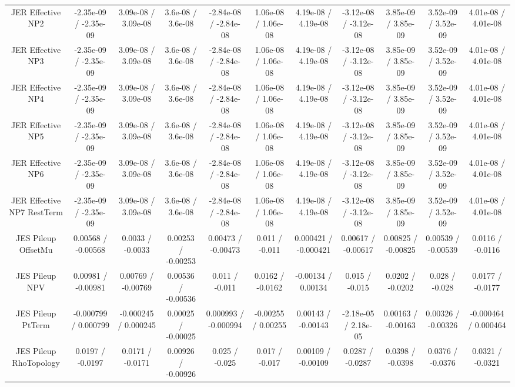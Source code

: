 \begin{table}[htbp]
\begin{center}
\begin{tabular}{|c|c|c|c|c|c|c|c|c|c|c|}
  JER Effective NP2 & -2.35e-09 / -2.35e-09 & 3.09e-08 / 3.09e-08 & 3.6e-08 / 3.6e-08 & -2.84e-08 / -2.84e-08 & 1.06e-08 / 1.06e-08 & 4.19e-08 / 4.19e-08 & -3.12e-08 / -3.12e-08 & 3.85e-09 / 3.85e-09 & 3.52e-09 / 3.52e-09 & 4.01e-08 / 4.01e-08 \\ 
  JER Effective NP3 & -2.35e-09 / -2.35e-09 & 3.09e-08 / 3.09e-08 & 3.6e-08 / 3.6e-08 & -2.84e-08 / -2.84e-08 & 1.06e-08 / 1.06e-08 & 4.19e-08 / 4.19e-08 & -3.12e-08 / -3.12e-08 & 3.85e-09 / 3.85e-09 & 3.52e-09 / 3.52e-09 & 4.01e-08 / 4.01e-08 \\ 
  JER Effective NP4 & -2.35e-09 / -2.35e-09 & 3.09e-08 / 3.09e-08 & 3.6e-08 / 3.6e-08 & -2.84e-08 / -2.84e-08 & 1.06e-08 / 1.06e-08 & 4.19e-08 / 4.19e-08 & -3.12e-08 / -3.12e-08 & 3.85e-09 / 3.85e-09 & 3.52e-09 / 3.52e-09 & 4.01e-08 / 4.01e-08 \\ 
  JER Effective NP5 & -2.35e-09 / -2.35e-09 & 3.09e-08 / 3.09e-08 & 3.6e-08 / 3.6e-08 & -2.84e-08 / -2.84e-08 & 1.06e-08 / 1.06e-08 & 4.19e-08 / 4.19e-08 & -3.12e-08 / -3.12e-08 & 3.85e-09 / 3.85e-09 & 3.52e-09 / 3.52e-09 & 4.01e-08 / 4.01e-08 \\ 
  JER Effective NP6 & -2.35e-09 / -2.35e-09 & 3.09e-08 / 3.09e-08 & 3.6e-08 / 3.6e-08 & -2.84e-08 / -2.84e-08 & 1.06e-08 / 1.06e-08 & 4.19e-08 / 4.19e-08 & -3.12e-08 / -3.12e-08 & 3.85e-09 / 3.85e-09 & 3.52e-09 / 3.52e-09 & 4.01e-08 / 4.01e-08 \\ 
  JER Effective NP7 RestTerm & -2.35e-09 / -2.35e-09 & 3.09e-08 / 3.09e-08 & 3.6e-08 / 3.6e-08 & -2.84e-08 / -2.84e-08 & 1.06e-08 / 1.06e-08 & 4.19e-08 / 4.19e-08 & -3.12e-08 / -3.12e-08 & 3.85e-09 / 3.85e-09 & 3.52e-09 / 3.52e-09 & 4.01e-08 / 4.01e-08 \\ 
  JES Pileup OffsetMu & 0.00568 / -0.00568 & 0.0033 / -0.0033 & 0.00253 / -0.00253 & 0.00473 / -0.00473 & 0.011 / -0.011 & 0.000421 / -0.000421 & 0.00617 / -0.00617 & 0.00825 / -0.00825 & 0.00539 / -0.00539 & 0.0116 / -0.0116 \\ 
  JES Pileup NPV & 0.00981 / -0.00981 & 0.00769 / -0.00769 & 0.00536 / -0.00536 & 0.011 / -0.011 & 0.0162 / -0.0162 & -0.00134 / 0.00134 & 0.015 / -0.015 & 0.0202 / -0.0202 & 0.028 / -0.028 & 0.0177 / -0.0177 \\ 
  JES Pileup PtTerm & -0.000799 / 0.000799 & -0.000245 / 0.000245 & 0.00025 / -0.00025 & 0.000993 / -0.000994 & -0.00255 / 0.00255 & 0.00143 / -0.00143 & -2.18e-05 / 2.18e-05 & 0.00163 / -0.00163 & 0.00326 / -0.00326 & -0.000464 / 0.000464 \\ 
  JES Pileup RhoTopology & 0.0197 / -0.0197 & 0.0171 / -0.0171 & 0.00926 / -0.00926 & 0.025 / -0.025 & 0.017 / -0.017 & 0.00109 / -0.00109 & 0.0287 / -0.0287 & 0.0398 / -0.0398 & 0.0376 / -0.0376 & 0.0321 / -0.0321 \\ 

\end{tabular}
\end{center}
\end{table}
